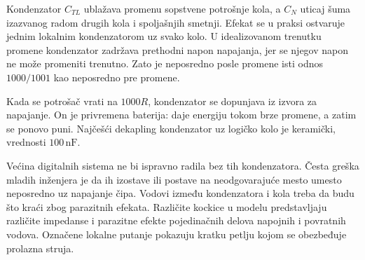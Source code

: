 Kondenzator $C_{TL}$ ublažava promenu sopstvene potrošnje kola, a $C_N$ uticaj šuma izazvanog radom drugih kola i spoljašnjih smetnji. Efekat se u praksi ostvaruje jednim lokalnim kondenzatorom uz svako kolo. U idealizovanom trenutku promene kondenzator zadržava prethodni napon napajanja, jer se njegov napon ne može promeniti trenutno. Zato je neposredno posle promene isti odnos $1000/1001$ kao neposredno pre promene.

Kada se potrošač vrati na $1000R$, kondenzator se dopunjava iz izvora za napajanje. On je privremena baterija: daje energiju tokom brze promene, a zatim se ponovo puni. Najčešći dekapling kondenzator uz logičko kolo je keramički, vrednosti $100\,\mathrm{nF}$.

Većina digitalnih sistema ne bi ispravno radila bez tih kondenzatora. Česta greška mladih inženjera je da ih izostave ili postave na neodgovarajuće mesto umesto neposredno uz napajanje čipa. Vodovi između kondenzatora i kola treba da budu što kraći zbog parazitnih efekata. Različite kockice u modelu predstavljaju različite impedanse i parazitne efekte pojedinačnih delova napojnih i povratnih vodova. Označene lokalne putanje pokazuju kratku petlju kojom se obezbeđuje prolazna struja.
